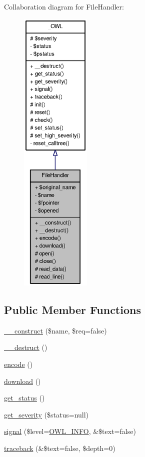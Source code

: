 Collaboration diagram for FileHandler:\nopagebreak
\begin{figure}[H]
\begin{center}
\leavevmode
\includegraphics[height=400pt]{classFileHandler__coll__graph}
\end{center}
\end{figure}
\subsection*{Public Member Functions}
\begin{DoxyCompactItemize}
\item 
\hyperlink{classFileHandler_a8d75c8ea0c532acdeae0a0a4efa3704a}{\_\-\_\-construct} (\$name, \$req=false)
\item 
\hyperlink{classFileHandler_a734859e8962992da99dd8f853da5ae43}{\_\-\_\-destruct} ()
\item 
\hyperlink{classFileHandler_aa29360bf94fd54d906256561f33d93ad}{encode} ()
\item 
\hyperlink{classFileHandler_ac17edc9b92643c32ae6040b1235c64dd}{download} ()
\item 
\hyperlink{class__OWL_a99ec771fa2c5c279f80152cc09e489a8}{get\_\-status} ()
\item 
\hyperlink{class__OWL_adf9509ef96858be7bdd9414c5ef129aa}{get\_\-severity} (\$status=null)
\item 
\hyperlink{class__OWL_a51ba4a16409acf2a2f61f286939091a5}{signal} (\$level=\hyperlink{owl_8severitycodes_8php_a139328861128689f2f4def6a399d9057}{OWL\_\-INFO}, \&\$text=false)
\item 
\hyperlink{class__OWL_aa29547995d6741b7d2b90c1d4ea99a13}{traceback} (\&\$text=false, \$depth=0)
\end{DoxyCompactItemize}
